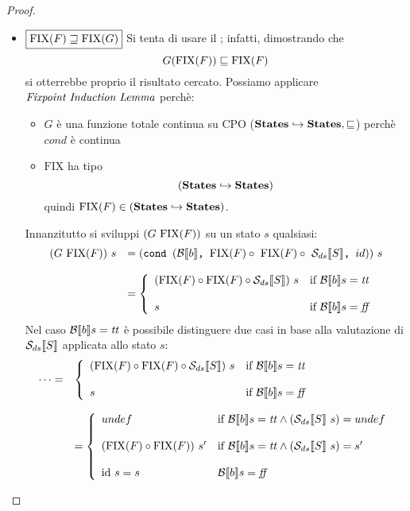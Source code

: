{\begin{proof}
\begin{itemize}
	\item $\boxed{\textrm{\normalfont{FIX}}(F) \sqsupseteq \textrm{\normalfont{FIX}}(G)}$
	Si tenta di usare il \FPIL; infatti, dimostrando che
	$$
	G(\textrm{\normalfont{FIX}}(F)) \sqsubseteq \textrm{\normalfont{FIX}}(F)
	$$
	si otterrebbe proprio il risultato cercato.
        Possiamo applicare $\textit{Fixpoint Induction Lemma}$ perchè:
        \begin{itemize}
         \item $G$ è una funzione totale continua su CPO 
          ($\mbox{\textbf{States}} \hookrightarrow \mbox{\textbf{States}}, \sqsubseteq$) perchè $cond$ 
          è continua
         \item $\text{FIX}$ ha tipo
          $$
          (\mbox{\textbf{States}} \hookrightarrow \mbox{\textbf{States}})
          $$ 
          quindi $\textrm{\normalfont{FIX}}(F) \in 
          (\mbox{\textbf{States}} \hookrightarrow \mbox{\textbf{States}})$.
        \end{itemize}
        Innanzitutto si sviluppi $(G\ \fixp{F})$ su un stato $s$ qualsiasi:
        $$
        \begin{array}{ll}
          (G \ \textrm{\normalfont{FIX}}(F))\ s & = (\mbox{\normalfont{\texttt{cond }}} (\mathcal{B}{}\llbracket b \rrbracket \textrm{\normalfont{\texttt{, }}} \textrm{\normalfont{FIX}}(F) \circ\  \textrm{\normalfont{FIX}}(F) \circ \
          \mathcal{S}_{ds}\llbracket S \rrbracket \textrm{\normalfont{\texttt{, }}} id))\ s \\
          & \\
          & = \left\lbrace \begin{array}{ll} (\textrm{\normalfont{FIX}}(F) \circ{} \textrm{\normalfont{FIX}}(F) \circ{} \mathcal{S}_{ds}\llbracket S \rrbracket)\ s & \mbox{if } \mathcal{B} \llbracket b \rrbracket s =
          \mbox{\textit{tt}} \\ & \\ s & \mbox{if } \mathcal{B} \llbracket b \rrbracket s = \mbox{\textit{ff}} \\ \end{array} \right. 
        \end{array}
        $$
        Nel caso $\mathcal{B} \llbracket b \rrbracket s = \mbox{\textit{tt}}$ è possibile distinguere due casi in base
        alla valutazione di $\mathcal{S}_{ds}\llbracket S \rrbracket$ applicata allo stato $s$:
        $$
        \begin{array}{ll}
        \dots = 
        & \caseFun{(\fixp{F} \circ \fixp{F} \circ \dsCtxt{S})\ s}{\B{b} =
          \semtrue}{s}{\B{b} = \semfalse}  \\
        \\
        & = \left\lbrace 
          \begin{array}{ll}
            undef & \mbox{if } \B{b} = \semtrue \land (\dsCtxt{S}\  s) = undef  \\
            &  \\                  
            (\fixp{F} \circ \fixp{F})\ s' & \mbox{if } \B{b} = \semtrue \land (\dsCtxt{S}\ s) = s'  \\
                  & \\
            \idDS\ s = s & \B{b} = \semfalse\\
          \end{array}
          \right. \\
        \end{array}
        $$


\end{itemize}
\end{proof}}
